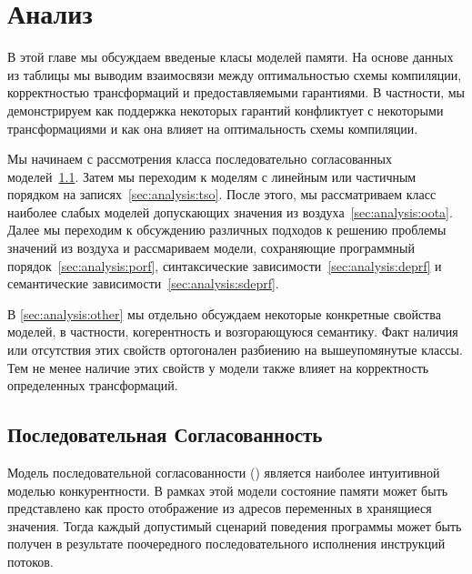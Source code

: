 \section{Анализ}
\label{sec:analysis}


В этой главе мы обсуждаем введеные класы моделей памяти.
На основе данных из таблицы 
мы выводим взаимосвязи между оптимальностью схемы компиляции,
корректностью трансформаций и предоставляемыми гарантиями. 
В частности, мы демонстрируем как поддержка 
некоторых гарантий конфликтует с некоторыми трансформациями 
и как она влияет на оптимальность схемы компиляции. 

Мы начинаем с рассмотрения класса 
последовательно согласованных моделей~\cref{sec:analysis:seqcst}.
Затем мы переходим к моделям с линейным или 
частичным порядком на записях~\cref{sec:analysis:tso}.
После этого, мы рассматриваем класс наиболее слабых моделей 
допускающих значения из воздуха~\cref{sec:analysis:oota}.
Далее мы переходим к обсуждению различных подходов 
к решению проблемы значений из воздуха и рассмариваем модели, 
сохраняющие программный порядок~\cref{sec:analysis:porf},
синтаксические зависимости~\cref{sec:analysis:deprf} и
семантические зависимости~\cref{sec:analysis:sdeprf}.
 
В \cref{sec:analysis:other} мы отдельно обсуждаем некоторые 
конкретные свойства моделей, в частности, когерентность и возгорающуюся семантику. 
Факт наличия или отсутствия этих свойств ортогонален
разбиению на вышеупомянутые классы. 
Тем не менее наличие этих свойств у модели также влияет 
на корректность определенных трансформаций.

\subsection{Последовательная Согласованность}
\label{sec:analysis:seqcst}

Модель последовательной согласованности (\SC)
является наиболее интуитивной моделью конкурентности.
В рамках этой модели состояние памяти может быть 
представлено как просто отображение из 
адресов переменных в хранящиеся значения. 
Тогда каждый допустимый сценарий поведения программы 
может быть получен в результате поочередного последовательного
исполнения инструкций потоков. 


